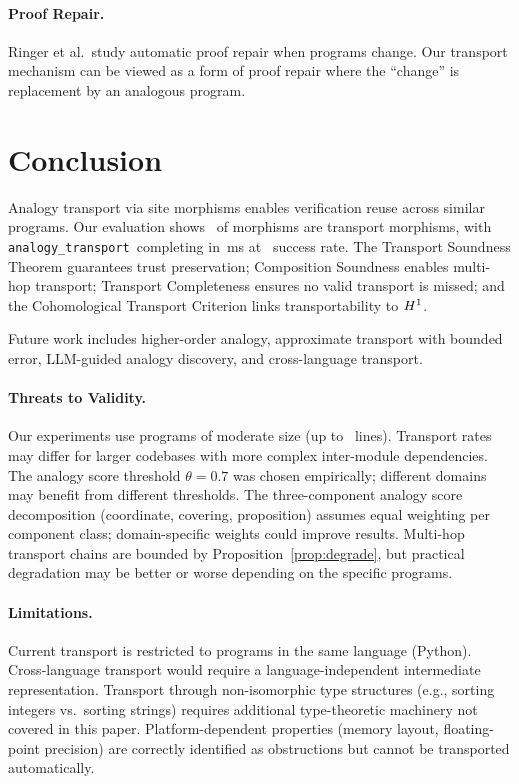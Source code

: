\documentclass[11pt]{article}
\newcommand{\AnalogyTransport}{\texttt{analogy\_transport}}
\begin{document}
\paragraph{Proof Repair.}
Ringer et al.\ study automatic proof repair when programs change.  Our
transport mechanism can be viewed as a form of proof repair where the
``change'' is replacement by an analogous program.

\section{Conclusion}\label{sec:conclusion}

Analogy transport via site morphisms enables verification reuse across
similar programs.  Our evaluation shows \compMorphTransportPct\ of
morphisms are transport morphisms, with \AnalogyTransport\ completing in
\compProfAnalogyTransportMeanMs\,ms at \compProfAnalogyTransportRate\
success rate.  The Transport Soundness Theorem guarantees trust
preservation; Composition Soundness enables multi-hop transport;
Transport Completeness ensures no valid transport is missed; and the
Cohomological Transport Criterion links transportability to $H^{1}$.

Future work includes higher-order analogy, approximate transport
with bounded error, LLM-guided analogy discovery, and cross-language
transport.

\paragraph{Threats to Validity.}
Our experiments use programs of moderate size (up to \compLargeMeanLines\
lines).  Transport rates may differ for larger codebases with more
complex inter-module dependencies.  The analogy score threshold
$\theta = 0.7$ was chosen empirically; different domains may benefit
from different thresholds.  The three-component analogy score
decomposition (coordinate, covering, proposition) assumes equal
weighting per component class; domain-specific weights could improve
results.  Multi-hop transport chains are bounded by
Proposition~\ref{prop:degrade}, but practical degradation may be
better or worse depending on the specific programs.

\paragraph{Limitations.}
Current transport is restricted to programs in the same language
(Python).  Cross-language transport would require a language-independent
intermediate representation.  Transport through non-isomorphic
type structures (e.g., sorting integers vs.\ sorting strings) requires
additional type-theoretic machinery not covered in this paper.
Platform-dependent properties (memory layout, floating-point
precision) are correctly identified as obstructions but cannot be
transported automatically.
\end{document}
